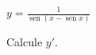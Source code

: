 \item $\displaystyle y = \frac{1}{\operatorname{sen}(x - \operatorname{sen} x)}$
\par
Calcule $y'$.
